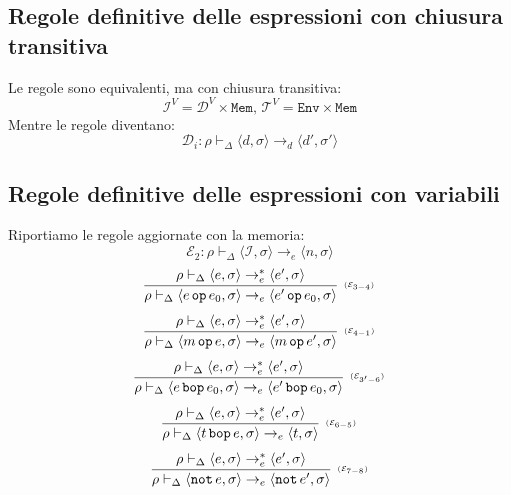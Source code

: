 \documentclass[oneside,a4paper,11pt]{book}
\theoremstyle{italicstyle}
\theoremstyle{normStyle}
\begin{document}
\subsection{Regole definitive delle espressioni con chiusura transitiva}
Le regole sono equivalenti, ma con chiusura transitiva:
\[
  \mathcal{I}^V=\mathcal{D}^V \times \texttt{Mem},\,\mathcal{T}^V = \texttt{Env}\times\texttt{Mem}
\]
Mentre le regole diventano:
\[
  \mathcal{D}_i : \rho \vdash_\Delta \langle d,\sigma \rangle \rightarrow_d \langle d',\sigma' \rangle
\]
\subsection{Regole definitive delle espressioni con variabili}
Riportiamo le regole aggiornate con la memoria:
\[
  \mathcal{E}_2: \rho \vdash_\Delta \langle \mathcal{I}, \sigma \rangle \rightarrow_e  \langle n, \sigma \rangle
\]
\[
    \infer[\scriptscriptstyle (\mathcal{E}_{3-4})]
    {
      \rho \vdash_\Delta \langle e \,\texttt{op} \,e_0, \sigma \rangle \rightarrow_e \langle e' \,\texttt{op} \,e_0, \sigma \rangle
    }
    {
      \rho \vdash_\Delta \langle e , \sigma \rangle \rightarrow^*_e \langle e', \sigma \rangle
    }
\]
\[
    \infer[\scriptscriptstyle (\mathcal{E}_{4-1})]
    {
      \rho \vdash_\Delta  \langle m \,\texttt{op} \,e, \sigma \rangle \rightarrow_e \langle m \,\texttt{op} \,e', \sigma \rangle
    }
    {
      \rho \vdash_\Delta \langle e , \sigma \rangle \rightarrow_e^* \langle e', \sigma \rangle
    }
\]
\[
    \infer[\scriptscriptstyle (\mathcal{E}_{3'-6})]
    {
      \rho \vdash_\Delta \langle e \,\texttt{bop} \,e_0, \sigma \rangle \rightarrow_e \langle e' \,\texttt{bop} \,e_0, \sigma \rangle
    }
    {
      \rho \vdash_\Delta \langle e , \sigma \rangle \rightarrow_e^* \langle e', \sigma \rangle
    }
\]
\[
    \infer[\scriptscriptstyle (\mathcal{E}_{6-5})]
    {
      \rho \vdash_\Delta  \langle t \,\texttt{bop} \,e, \sigma \rangle \rightarrow_e \langle t, \sigma \rangle
    }
    {
      \rho \vdash_\Delta \langle e , \sigma \rangle \rightarrow_e^* \langle e', \sigma \rangle
    }
\]
\[
    \infer[\scriptscriptstyle (\mathcal{E}_{7-8})]
    {
      \rho \vdash_\Delta \langle \texttt{not} \,e, \sigma \rangle \rightarrow_e \langle \texttt{not} \,e', \sigma \rangle
    }
    {
      \rho \vdash_\Delta \langle e , \sigma \rangle \rightarrow_e^* \langle e', \sigma \rangle
    }
\]
\end{document}
